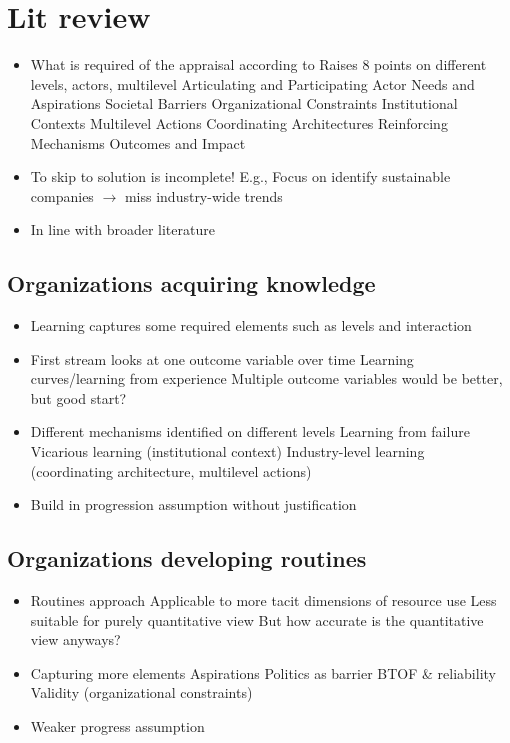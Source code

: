 \documentclass{article}
\begin{document}
	\section{Lit review}
	
	\begin{itemize}
		\item What is required of the appraisal according to \citet{George2016}
			\subitem Raises 8 points on different levels, actors, multilevel
				\subsubitem Articulating and Participating
				\subsubitem Actor Needs and Aspirations
				\subsubitem Societal Barriers
				\subsubitem Organizational Constraints
				\subsubitem Institutional Contexts
				\subsubitem Multilevel Actions
				\subsubitem Coordinating Architectures
				\subsubitem Reinforcing Mechanisms
				\subsubitem Outcomes and Impact
		\item To skip to solution is incomplete!
			\subitem E.g., \citet{Ferraro2015, Slawinski2015}
			\subitem Focus on identify sustainable companies $\rightarrow$ miss industry-wide trends
		\item In line with broader literature \citep{Reyers2018}
	\end{itemize}
	
	\subsection{Organizations acquiring knowledge}
	\begin{itemize}
		\item Learning captures some required elements such as levels and interaction
		\item First stream looks at one outcome variable over time
			\subitem Learning curves/learning from experience
			\subitem Multiple outcome variables would be better, but good start?
		\item Different mechanisms identified on different levels
			\subitem Learning from failure
			\subitem Vicarious learning (institutional context)
			\subitem Industry-level learning (coordinating architecture, multilevel actions)
		\item Build in progression assumption without justification
	\end{itemize}

	\subsection{Organizations developing routines}
	\begin{itemize}
		\item Routines approach
			\subitem Applicable to more tacit dimensions of resource use
			\subitem Less suitable for purely quantitative view
			\subitem But how accurate is the quantitative view anyways?
		\item Capturing more elements
			\subitem Aspirations
			\subitem Politics as barrier
				\subsubitem BTOF \& reliability
			\subitem Validity (organizational constraints)
		\item Weaker progress assumption
	\end{itemize}
	
\end{document}
